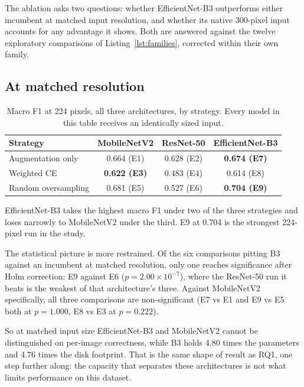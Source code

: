 The ablation asks two questions: whether EfficientNet-B3 outperforms either incumbent at
matched input resolution, and whether its native 300-pixel input accounts for any
advantage it shows. Both are answered against the twelve exploratory comparisons of
Listing~\ref{lst:families}, corrected within their own family.

\subsection{At matched resolution}

\begin{table}[htbp]
\centering
\caption{Macro F1 at 224 pixels, all three architectures, by strategy. Every model in
this table receives an identically sized input.}
\label{tab:b3-matched}
\small
\begin{tabular}{@{}lccc@{}}
\toprule
\textbf{Strategy} & \textbf{MobileNetV2} & \textbf{ResNet-50} & \textbf{EfficientNet-B3} \\
\midrule
Augmentation only   & 0.664 (E1) & 0.628 (E2) & \textbf{0.674 (E7)} \\
Weighted CE         & \textbf{0.622 (E3)} & 0.483 (E4) & 0.614 (E8) \\
Random oversampling & 0.681 (E5) & 0.527 (E6) & \textbf{0.704 (E9)} \\
\bottomrule
\end{tabular}
\end{table}

EfficientNet-B3 takes the highest macro F1 under two of the three strategies and loses
narrowly to MobileNetV2 under the third. E9 at 0.704 is the strongest 224-pixel run in
the study.

The statistical picture is more restrained. Of the six comparisons pitting B3 against an
incumbent at matched resolution, only one reaches significance after Holm correction: E9
against E6 ($p = 2.00 \times 10^{-7}$), where the ResNet-50 run it beats is the weakest
of that architecture's three. Against MobileNetV2 specifically, all three comparisons are
non-significant (E7 vs E1 and E9 vs E5 both at $p = 1.000$, E8 vs E3 at $p = 0.222$).

So at matched input size EfficientNet-B3 and MobileNetV2 cannot be distinguished on
per-image correctness, while B3 holds 4.80 times the parameters and 4.76 times the disk
footprint. That is the same shape of result as RQ1, one step further along: the capacity
that separates these architectures is not what limits performance on this dataset.

